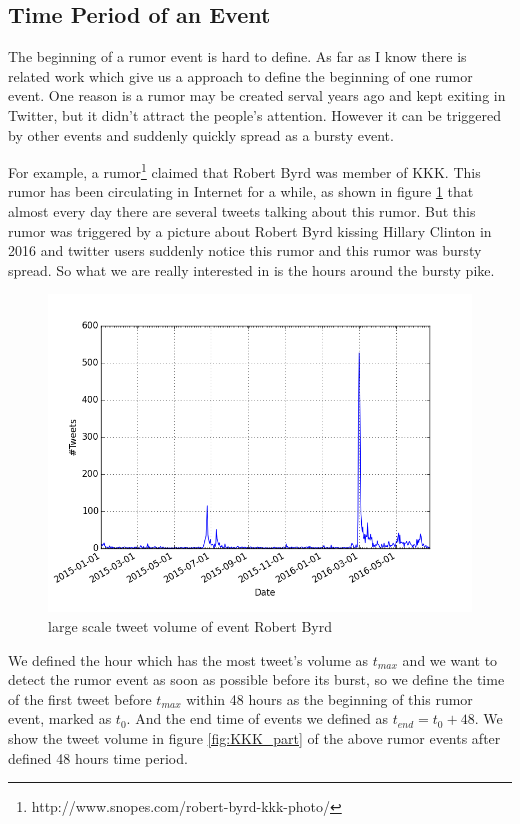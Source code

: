 \subsection{Time Period of an Event}
\label{sec:Time_Period_of_an_Event}

The beginning of a rumor event is hard to define. As far as I  know there is related work which give us a approach to define the beginning of one rumor event. One reason is a rumor may be created serval years ago and kept exiting in Twitter, but it didn't attract the people's attention. However it can be triggered by other events and suddenly quickly spread as a bursty event.

For example, a rumor\footnote{http://www.snopes.com/robert-byrd-kkk-photo/} claimed that Robert Byrd was member of KKK. This rumor has been circulating in Internet for a while, as shown in figure \ref{fig:KKK_full} that almost every day there are several tweets talking about this rumor. But this rumor was triggered by a picture about Robert Byrd kissing Hillary Clinton in 2016 and twitter users suddenly notice this rumor and this rumor was bursty spread. So what we are really interested in is the hours around the bursty pike.
 
\begin{figure}[!h]
\centering
\includegraphics[width=0.7\columnwidth]{images/KKK_figure.png}
\caption{large scale tweet volume of event Robert Byrd}
\label{fig:KKK_full}
\end{figure}

 We defined the hour which has the most tweet's volume as $t_{max}$ and we want to detect the rumor event as soon as possible before its burst, so we define the time of the first tweet before $t_{max}$ within 48 hours as the beginning of this rumor event, marked as $t_{0}$. And the end time of events we defined as $t_{end}=t_0+48$. We show the tweet volume in figure \ref{fig:KKK_part} of the above rumor events after defined 48 hours time period.
  
